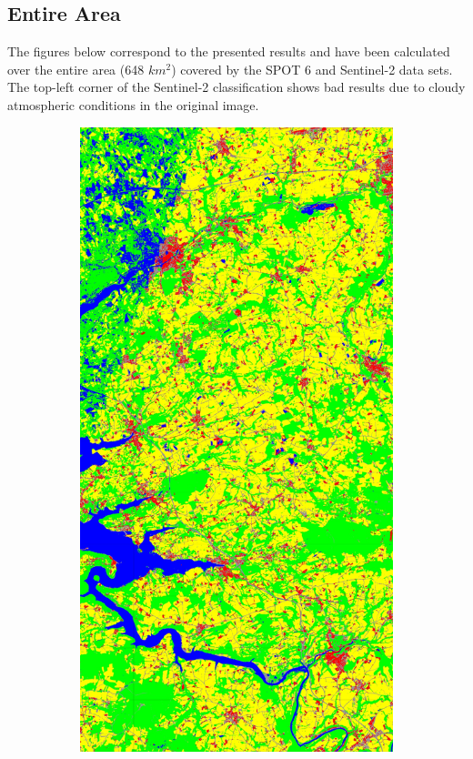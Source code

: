 \documentclass[10pt]{article}
\begin{document}
\newpage

\subsection{Entire Area}
The figures below correspond to the presented results and have been calculated over the entire area (648 $km^2$) covered by the SPOT 6 and Sentinel-2 data sets. The top-left corner of the Sentinel-2 classification shows bad results due to cloudy atmospheric conditions in the original image.

\label{app:subsec:entire_area}

\begin{figure}[H]
    \centering 
    \begin{subfigure}{0.49\textwidth}
        \centering
        \includegraphics[width=\textwidth]{all_classif_S2}

\end{subfigure}
\end{figure}
\end{document}
